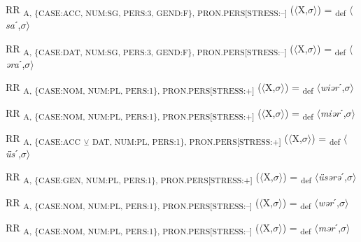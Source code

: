{\begin{exe}
 RR \textsubscript{A, \{CASE:ACC, NUM:SG, PERS:3, GEND:F\}, PRON.PERS[STRESS:–]} ($\langle$X,$\sigma $$\rangle$) = \textsubscript{def} $\langle$\textit{sa}ˊ,$\sigma $$\rangle$
\end{exe}

\begin{exe}
 RR \textsubscript{A, \{CASE:DAT, NUM:SG, PERS:3, GEND:F\}, PRON.PERS[STRESS:–]} ($\langle$X,$\sigma $$\rangle$) = \textsubscript{def} $\langle$\textit{əra}ˊ,$\sigma $$\rangle$
\end{exe}

\begin{exe}
 RR \textsubscript{A, \{CASE:NOM, NUM:PL, PERS:1\}, PRON.PERS[STRESS:+]} ($\langle$X,$\sigma $$\rangle$) = \textsubscript{def} $\langle$\textit{wiər}ˊ,$\sigma $$\rangle$
\end{exe}

\begin{exe}
 RR \textsubscript{A, \{CASE:NOM, NUM:PL, PERS:1\}, PRON.PERS[STRESS:+]} ($\langle$X,$\sigma $$\rangle$) = \textsubscript{def} $\langle$\textit{miər}ˊ,$\sigma $$\rangle$
\end{exe}

\begin{exe}
 RR \textsubscript{A, \{CASE:ACC} \textsubscript{${\veebar}$}\textsubscript{ DAT, NUM:PL, PERS:1\}, PRON.PERS[STRESS:+]} ($\langle$X,$\sigma $$\rangle$) = \textsubscript{def} $\langle$\textit{ǖs}ˊ,$\sigma $$\rangle$
\end{exe}

\begin{exe}
 RR \textsubscript{A, \{CASE:GEN, NUM:PL, PERS:1\}, PRON.PERS[STRESS:+]} ($\langle$X,$\sigma $$\rangle$) = \textsubscript{def} $\langle$\textit{üsərə}ˊ,$\sigma $$\rangle$
\end{exe}

\begin{exe}
 RR \textsubscript{A, \{CASE:NOM, NUM:PL, PERS:1\}, PRON.PERS[STRESS:–]} ($\langle$X,$\sigma $$\rangle$) = \textsubscript{def} $\langle$\textit{wər}ˊ,$\sigma $$\rangle$
\end{exe}

\begin{exe}
 RR \textsubscript{A, \{CASE:NOM, NUM:PL, PERS:1\}, PRON.PERS[STRESS:–]} ($\langle$X,$\sigma $$\rangle$) = \textsubscript{def} $\langle$\textit{mər}ˊ,$\sigma $$\rangle$
\end{exe}

}
